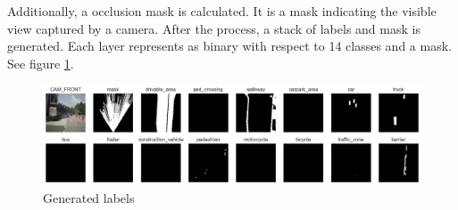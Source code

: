 Additionally, a occlusion mask is calculated. It is a mask indicating the visible view captured by a camera.
After the process, a stack of labels and mask is generated. Each layer represents as binary with respect to 14 classes and a mask. See figure \ref{fig:GeneratedLabels}.

\begin{figure}[H]
  \centering
  \includegraphics[width=1\textwidth]{img/3-binary-gt.png}
  \caption{Generated labels}
  \label{fig:GeneratedLabels}
\end{figure}

  
